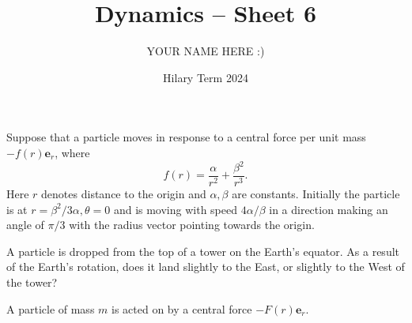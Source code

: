 \documentclass[answers]{exam}
\title{Dynamics -- Sheet 6}
\author{YOUR NAME HERE :)}
\date{Hilary Term 2024}
\begin{document}
\maketitle
\begin{questions}

\question%
Suppose that a particle moves in response to a central force per unit mass $-f(r) \mathbf{e}_{r}$, where \[
	f(r)=\frac{\alpha}{r^{2}}+\frac{\beta^{2}}{r^{3}}.
\] Here $r$ denotes distance to the origin and $\alpha, \beta$ are constants. Initially the particle is at $r=\beta^{2} / 3 \alpha, \theta=0$ and is moving with speed $4 \alpha / \beta$ in a direction making an angle of $\pi / 3$ with the radius vector pointing towards the origin.



\question%
A particle is dropped from the top of a tower on the Earth's equator. As a result of the Earth's rotation, does it land slightly to the East, or slightly to the West of the tower?



\question%
A particle of mass $m$ is acted on by a central force $-F(r) \mathbf{e}_{r}$.




\end{questions}
\end{document}
